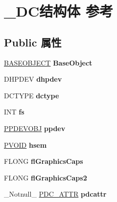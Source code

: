 \hypertarget{struct___d_c}{}\section{\+\_\+\+D\+C结构体 参考}
\label{struct___d_c}
\subsection*{Public 属性}
\begin{DoxyCompactItemize}
\item 
\mbox{\label{struct___d_c_aa039c6997a78e2f45230646a5f64576d}} 
\hyperlink{class_b_a_s_e_o_b_j_e_c_t}{B\+A\+S\+E\+O\+B\+J\+E\+CT} {\bfseries Base\+Object}
\item 
\mbox{\label{struct___d_c_a5678c7f42dbeff5ec1534217d19f2b11}} 
D\+H\+P\+D\+EV {\bfseries dhpdev}
\item 
\mbox{\label{struct___d_c_a869350aa374c320f6031db4bdcc2913f}} 
D\+C\+T\+Y\+PE {\bfseries dctype}
\item 
\mbox{\label{struct___d_c_afd72d7ad6d5356890a247319f7045033}} 
I\+NT {\bfseries fs}
\item 
\mbox{\label{struct___d_c_aa491e02f7fb6d52650257465ed7435ef}} 
\hyperlink{struct___p_d_e_v_o_b_j}{P\+P\+D\+E\+V\+O\+BJ} {\bfseries ppdev}
\item 
\mbox{\label{struct___d_c_afe6d53119a15e7008b1ea504a43b1779}} 
\hyperlink{interfacevoid}{P\+V\+O\+ID} {\bfseries hsem}
\item 
\mbox{\label{struct___d_c_a0de26e8464a80357fc2d3a603fe0025c}} 
F\+L\+O\+NG {\bfseries fl\+Graphics\+Caps}
\item 
\mbox{\label{struct___d_c_aca333883a78234d37de3960f5d8c48ba}} 
F\+L\+O\+NG {\bfseries fl\+Graphics\+Caps2}
\item 
\mbox{\label{struct___d_c_a0e2e234b1e19265b7f55257c5cd63027}} 
\+\_\+\+Notnull\+\_\+ \hyperlink{struct___d_c___a_t_t_r}{P\+D\+C\+\_\+\+A\+T\+TR} {\bfseries pdcattr}
\item 

\end{DoxyCompactItemize}
